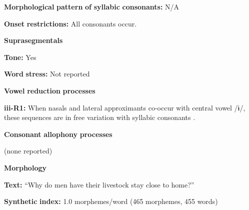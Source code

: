 \documentclass[output=paper]{langsci/langscibook}
\begin{document}
\begin{styleBody}
\textbf{Morphological} \textbf{pattern} \textbf{of} \textbf{syllabic} \textbf{consonants:} N/A
\end{styleBody}

\begin{styleBody}
\textbf{Onset} \textbf{restrictions:} All consonants occur.
\end{styleBody}

\begin{styleBody}
\textbf{Suprasegmentals}
\end{styleBody}

\begin{styleBody}
\textbf{Tone:} Yes
\end{styleBody}

\begin{styleBody}
\textbf{Word} \textbf{stress:} Not reported
\end{styleBody}

\begin{styleBody}
\textbf{Vowel} \textbf{reduction} \textbf{processes}
\end{styleBody}

\begin{styleBody}
\textbf{iii-R1:} When nasals and lateral approximants co-occur with central vowel /ɨ/, these sequences are in free variation with syllabic consonants \citep[31]{Gerner2013}.
\end{styleBody}

\begin{styleBody}
\textbf{Consonant} \textbf{allophony} \textbf{processes}
\end{styleBody}

\begin{styleBody}
(none reported)
\end{styleBody}

\begin{styleBody}
\textbf{Morphology}
\end{styleBody}

\begin{styleBody}
\textbf{Text:} “Why do men have their livestock stay close to home?” \citep[525-530]{Gerner2013}
\end{styleBody}

\begin{styleBody}
\textbf{Synthetic} \textbf{index:} 1.0 morphemes/word (465 morphemes, 455 words)
\end{styleBody}
\end{document}

